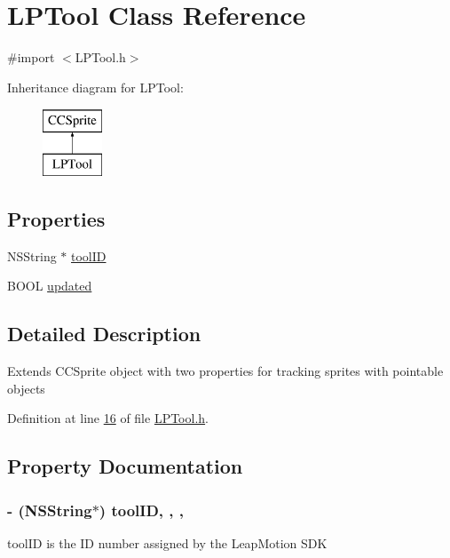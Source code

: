 \hypertarget{interface_l_p_tool}{\section{L\-P\-Tool Class Reference}
\label{d3/d2e/interface_l_p_tool}
}


{\ttfamily \#import $<$L\-P\-Tool.\-h$>$}

Inheritance diagram for L\-P\-Tool\-:\begin{figure}[H]
\begin{center}
\leavevmode
\includegraphics[height=2.000000cm]{d3/d2e/interface_l_p_tool}
\end{center}
\end{figure}
\subsection*{Properties}
\begin{DoxyCompactItemize}
\item 
N\-S\-String $\ast$ \hyperlink{interface_l_p_tool_aafbd850bbcc6c8e33ba201d45a8107c2}{tool\-I\-D}
\item 
B\-O\-O\-L \hyperlink{interface_l_p_tool_a25dbad647c537177b138bdbbb01936e4}{updated}
\end{DoxyCompactItemize}


\subsection{Detailed Description}
Extends C\-C\-Sprite object with two properties for tracking sprites with pointable objects 

Definition at line \hyperlink{_l_p_tool_8h_source_l00016}{16} of file \hyperlink{_l_p_tool_8h_source}{L\-P\-Tool.\-h}.



\subsection{Property Documentation}
\hypertarget{interface_l_p_tool_aafbd850bbcc6c8e33ba201d45a8107c2}{
\subsubsection[{tool\-I\-D}]{\setlength{\rightskip}{0pt plus 5cm}-\/ (N\-S\-String$\ast$) tool\-I\-D\hspace{0.3cm}{\ttfamily [read]}, {\ttfamily [write]}, {\ttfamily [nonatomic]}, {\ttfamily [strong]}}}\label{d3/d2e/interface_l_p_tool_aafbd850bbcc6c8e33ba201d45a8107c2}
tool\-I\-D is the I\-D number assigned by the Leap\-Motion S\-D\-K 

